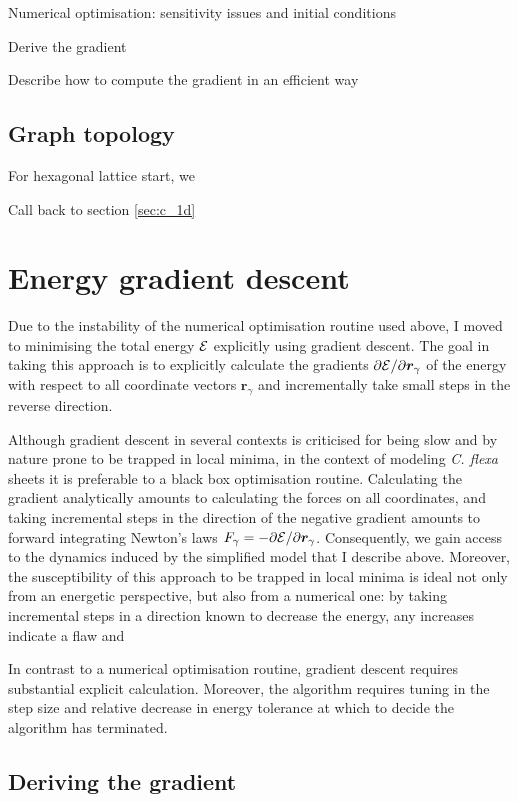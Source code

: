 Numerical optimisation: sensitivity issues and initial conditions

Derive the gradient

Describe how to compute the gradient in an efficient way

\subsection{Graph topology}
For hexagonal lattice start, we 

Call back to section \ref{sec:c_1d}

\section{Energy gradient descent}

Due to the instability of the numerical optimisation routine used above, I moved to minimising the total energy $\mathcal{E}$ explicitly using gradient descent. 
The goal in taking this approach is to explicitly calculate the gradients $\partial \mathcal{E} / \partial \bm{r}_\gamma$ of the energy with respect to all coordinate vectors $\bm{r}_\gamma$ and incrementally take small steps in the reverse direction. 

Although gradient descent in several contexts is criticised for being slow and by nature prone to be trapped in local minima, in the context of modeling \textit{C. flexa} sheets it is preferable to a black box optimisation routine. Calculating the gradient analytically amounts to calculating the forces on all coordinates, and taking incremental steps in the direction of the negative gradient amounts to forward integrating Newton's laws $F_\gamma = - \partial\mathcal{E}/\partial\bm{r}_\gamma$. 
Consequently, we gain access to the dynamics induced by the simplified model that I describe above. 
Moreover, the susceptibility of this approach to be trapped in local minima is ideal not only from an energetic perspective, but also from a numerical one: by taking incremental steps in a direction known to decrease the energy, any increases indicate a flaw and 

In contrast to a numerical optimisation routine, gradient descent requires substantial explicit calculation. Moreover, the algorithm requires tuning in the step size and relative decrease in energy tolerance at which to decide the algorithm has terminated. 

\subsection{Deriving the gradient}

